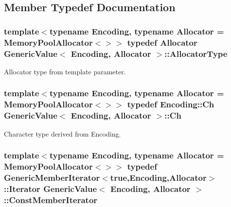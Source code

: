 \subsection{Member Typedef Documentation}
\subsubsection[{\texorpdfstring{Allocator\+Type}{AllocatorType}}]{\setlength{\rightskip}{0pt plus 5cm}template$<$typename Encoding, typename Allocator = Memory\+Pool\+Allocator$<$$>$$>$ typedef Allocator {\bf Generic\+Value}$<$ Encoding, Allocator $>$\+::{\bf Allocator\+Type}}\hypertarget{classGenericValue_a7beb83860c1b8d2a0e2a7da9796b2fa1}{}\label{classGenericValue_a7beb83860c1b8d2a0e2a7da9796b2fa1}


Allocator type from template parameter. 

\subsubsection[{\texorpdfstring{Ch}{Ch}}]{\setlength{\rightskip}{0pt plus 5cm}template$<$typename Encoding, typename Allocator = Memory\+Pool\+Allocator$<$$>$$>$ typedef Encoding\+::\+Ch {\bf Generic\+Value}$<$ Encoding, Allocator $>$\+::{\bf Ch}}\hypertarget{classGenericValue_ade0e0ce64ccd5d852da57a35e720bafb}{}\label{classGenericValue_ade0e0ce64ccd5d852da57a35e720bafb}


Character type derived from Encoding. 

\subsubsection[{\texorpdfstring{Const\+Member\+Iterator}{ConstMemberIterator}}]{\setlength{\rightskip}{0pt plus 5cm}template$<$typename Encoding, typename Allocator = Memory\+Pool\+Allocator$<$$>$$>$ typedef {\bf Generic\+Member\+Iterator}$<$true,Encoding,Allocator$>$\+::Iterator {\bf Generic\+Value}$<$ Encoding, Allocator $>$\+::{\bf Const\+Member\+Iterator}}\hypertarget{classGenericValue_aac08c3e660a9036d3dcb8b10ff6c61f4}{}\label{classGenericValue_aac08c3e660a9036d3dcb8b10ff6c61f4}


